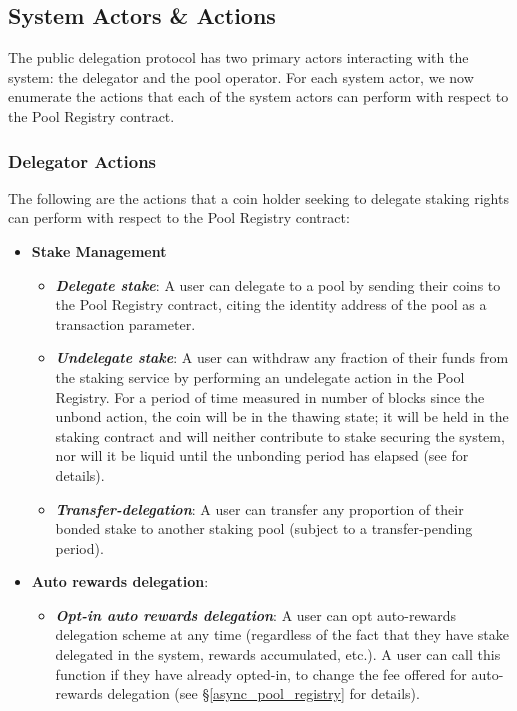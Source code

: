 \subsection{System Actors \& Actions}
The public delegation protocol has two primary actors interacting with the system: the delegator and the pool operator. For each system actor, we now enumerate the actions that each of the system actors can perform with respect to the Pool Registry contract.  

\subsubsection{Delegator Actions}
The following are the actions that a coin holder seeking to delegate staking rights can perform with respect to the Pool Registry contract: 
\begin{itemize}
    \item \textbf{Stake Management}
    \begin{itemize}
        \item \textit{\textbf{Delegate stake}}: A user can delegate to a pool by sending their coins to the Pool Registry contract, citing the identity address of the pool as a transaction parameter. 
        \item \textit{\textbf{Undelegate stake}}: A user can withdraw any fraction of their funds from the staking service by performing an undelegate action in the Pool Registry. For a period of time measured in number of blocks since the unbond action, the coin will be in the thawing state; it will be held in the staking contract and will neither contribute to stake securing the system, nor will it be liquid until the unbonding period has elapsed (see \cite{WZS19} for details).
        \item \textit{\textbf{Transfer-delegation}}: A user can transfer any proportion of their bonded stake to another staking pool (subject to a transfer-pending period).
    \end{itemize}
    \item \textbf{Auto rewards delegation}: 
    \begin{itemize}
        \item \textit{\textbf{Opt-in auto rewards delegation}}: A user can opt auto-rewards delegation scheme at any time (regardless of the fact that they have stake delegated in the system, rewards accumulated, etc.). A user can call this function if they have already opted-in, to change the fee offered for auto-rewards delegation (see \S\ref{async_pool_registry} for details). 

\end{itemize}
\end{itemize}
